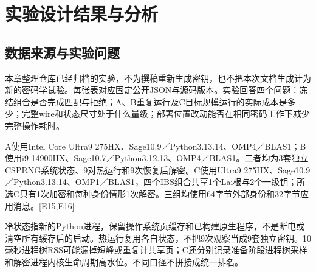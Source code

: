 \documentclass[UTF8,a4paper,12pt,oneside,openany,fontset=fandol]{ctexrep}
\begin{document}
\chapter{实验设计结果与分析}
\section{数据来源与实验问题}
本章整理仓库已经归档的实验，不为撰稿重新生成密钥，也不把本次文档生成计为新的密码学试验。每张表对应固定公开JSON与源码版本。实验回答四个问题：冻结组合是否完成匹配与拒绝；A、B重复运行及C目标规模运行的实际成本是多少；完整wire和状态尺寸处于什么量级；部署位置改动能否在相同密码工作下减少完整操作耗时。

A使用Intel Core Ultra9 275HX、Sage10.9／Python3.13.14、OMP4／BLAS1；B使用i9-14900HX、Sage10.7／Python3.12.13、OMP4／BLAS1。二者均为3套独立CSPRNG系统状态、9对热运行和9次恢复后解密。C使用Ultra9 275HX、Sage10.9／Python3.13.14、OMP1／BLAS1，四个IBS组合共享1个Lai根与2个一级钥；所选C只有1次加密和每种身份情形1次解密。三组均使用64字节外部身份和32字节应用消息。[E15,E16]

冷状态指新的Python进程，保留操作系统页缓存和已构建原生程序，不是断电或清空所有缓存后的启动。热运行复用各自状态，不把9次观察当成9套独立密钥。10毫秒进程树RSS可能漏掉短峰或重复计共享页；C还分别记录准备阶段进程树采样和解密进程内核生命周期高水位。不同口径不拼接成统一排名。
\end{document}
